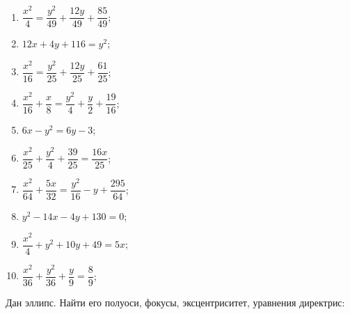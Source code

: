 \begin{multicols}{2}
\begin{enumerate}
				\item \( \dfrac{x^2}{4} = \dfrac{y^2}{49} + \dfrac{12 y}{49} + \dfrac{85}{49} \);
				\item \( 12 x + 4 y + 116 = y^2 \);
				\item \( \dfrac{x^2}{16} = \dfrac{y^2}{25} + \dfrac{12 y}{25} + \dfrac{61}{25} \);
				\item \( \dfrac{x^2}{16} + \dfrac{x}{8} = \dfrac{y^2}{4} + \dfrac{y}{2} + \dfrac{19}{16} \);
				\item \( 6 x - y^2 = 6 y - 3 \);
				\item \( \dfrac{x^2}{25} + \dfrac{y^2}{4} + \dfrac{39}{25} = \dfrac{16 x}{25} \);
				\item \( \dfrac{x^2}{64} + \dfrac{5 x}{32} = \dfrac{y^2}{16} - y + \dfrac{295}{64} \);
				\item \( y^2 - 14 x - 4 y + 130 = 0 \);
				\item \( \dfrac{x^2}{4} + y^2 + 10 y + 49 = 5x \);
				\item \( \dfrac{x^2}{36} + \dfrac{y^2}{36} + \dfrac{y}{9} = \dfrac{8}{9} \);

			\setcounter{tasks}{\value{enumi}}
		\end{enumerate}
	\end{multicols}

	\vspace{15pt}
	Дан эллипс. Найти его полуоси, фокусы, эксцентриситет, уравнения директрис:

